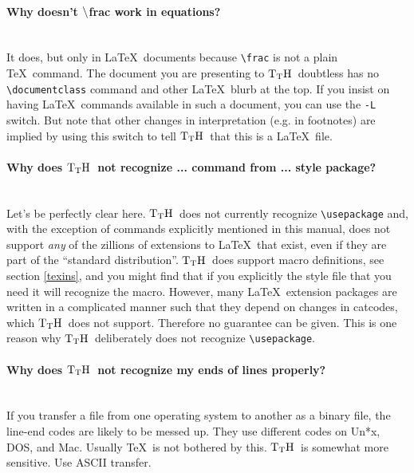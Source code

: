 \documentclass[12pt]{article}
\def\TtH{$\rm{}T_TH$}
\begin{document}
\paragraph{Why doesn't $\tt\backslash$frac work in equations?}\leavevmode\\
It does, but only in \LaTeX\ documents because \verb|\frac| is not a
plain \TeX\ command. The document you are presenting to \TtH\ doubtless
has no \verb|\documentclass| command and other \LaTeX\ blurb at the top.
If you insist on having \LaTeX\ commands available in such a document,
you can use the \verb|-L| switch. But note that other changes in
interpretation (e.g. in footnotes) are implied by using this switch to
tell \TtH\ that this is a \LaTeX\ file.


\paragraph{Why does \TtH\ not recognize ... command from ... style
package?}\leavevmode\\
Let's be perfectly clear here. \TtH\ does not currently recognize 
\verb|\usepackage| and, with the exception of commands explicitly
mentioned in this manual, does not support \emph{any} of the zillions
of extensions to \LaTeX\ that exist, even if they are part of the
``standard distribution''. \TtH\ does support macro definitions, see
section \ref{texins}, and
you might find that if you explicitly \verb!! the style file
that you need it will recognize the macro. However, many \LaTeX\
extension packages are written in a complicated manner such that they
depend on changes in catcodes, which \TtH\ does not
support. Therefore no guarantee can be given. This is one reason why
\TtH\ deliberately does not recognize \verb|\usepackage|.

\paragraph{Why does \TtH\ not recognize my ends of lines properly?}\leavevmode\\
If you transfer a file from one operating system to another as a
binary file, the line-end codes are likely to be messed up. They use
different codes on Un*x, DOS, and Mac. Usually \TeX\ is not bothered by
this. \TtH\ is somewhat more sensitive. Use ASCII transfer.
\end{document}
